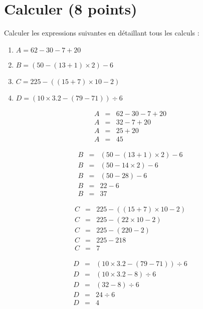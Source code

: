 \section{Calculer (8 points)}


\begin{questions}
	\question[4] Calculer les expressions suivantes en détaillant tous les calculs :
	
	\begin{enumerate}
		\item $A = 62 - 30 - 7 + 20$
		
		\item $B = (50 - (13 + 1) \times 2) - 6$
		
		\item $C= 225 - ((15 + 7) \times 10 - 2)$
		
		\item $D= (10 \times \num{3.2} - (79 - 71)) \div 6$
	\end{enumerate}


	\begin{solution}
		
		\begin{multicols}{2}
			
		\begin{eqnarray*}
			A &=& 62 - 30 - 7 + 20 \\
			A &=& 32 - 7 + 20 \\
			A &=& 25 + 20 \\
			A &=& 45
		\end{eqnarray*}
		
		\begin{eqnarray*}
			B &=& (50 - (13 + 1) \times 2) - 6 \\
			B &=& (50 - 14 \times 2) - 6  \\
			B &=& (50 - 28) - 6  \\
			B &=& 22 - 6  \\
			B &=& 37
		\end{eqnarray*}
		
		\begin{eqnarray*}
			C &=& 225 - ((15 + 7) \times 10 - 2)\\
			C &=& 225 - (22 \times 10 - 2) \\
			C &=& 225 - (220 - 2) \\
			C &=& 225 - 218  \\
			C &=& 7
		\end{eqnarray*}
		
		\begin{eqnarray*}
			D &=& (10 \times \num{3.2} - (79 - 71)) \div 6\\
			D &=& (10 \times \num{3.2} - 8) \div 6 \\
			D &=& (32 - 8) \div 6 \\
			D &=& 24 \div 6  \\
			D &=& 4
		\end{eqnarray*}
		\end{multicols}
	\end{solution}


\end{questions}
